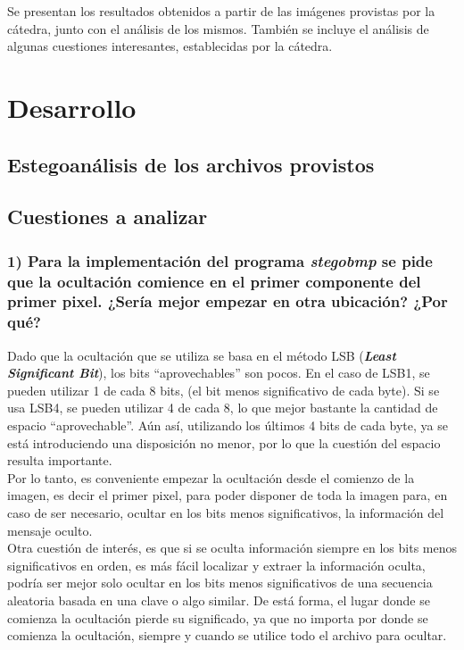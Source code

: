 \documentclass[a4paper,10pt]{article}
\begin{document}
Se presentan los resultados obtenidos a partir de las imágenes provistas por la cátedra, junto con el análisis de los mismos.
También se incluye el análisis de algunas cuestiones interesantes, establecidas por la cátedra.

\section{Desarrollo}

\subsection{Estegoanálisis de los archivos provistos}

\subsection{Cuestiones a analizar}

\subsubsection*{ 1) Para la implementación del programa \textit{stegobmp} se pide que la ocultación comience en el
primer componente del primer pixel. ¿Sería mejor empezar en otra ubicación? ¿Por qué?}

Dado que la ocultación que se utiliza se basa en el método LSB (\textit{\textbf{Least Significant Bit}}), los bits ``aprovechables'' son pocos. En el caso de 
LSB1, se pueden utilizar 1 de cada 8 bits, (el bit menos significativo de cada byte). Si se usa LSB4, se pueden utilizar 4 de cada 8, lo que mejor bastante la cantidad de 
espacio ``aprovechable''. Aún así, utilizando los últimos 4 bits de cada byte, ya se está introduciendo una disposición no menor, por lo que la cuestión del espacio resulta 
importante. \\

Por lo tanto, es conveniente empezar la ocultación desde el comienzo de la imagen, es decir el primer pixel, para poder disponer de toda la imagen para, en caso de ser necesario,
ocultar en los bits menos significativos, la información del mensaje oculto.\\

Otra cuestión de interés, es que si se oculta información siempre en los bits menos significativos en orden, es más fácil localizar y extraer la información oculta, podría 
ser mejor solo ocultar en los bits menos significativos de una secuencia aleatoria basada en una clave o algo similar. De está forma, el lugar donde se comienza la ocultación
pierde su significado, ya que no importa por donde se comienza la ocultación, siempre y cuando se utilice todo el archivo para ocultar.\\
\end{document}
